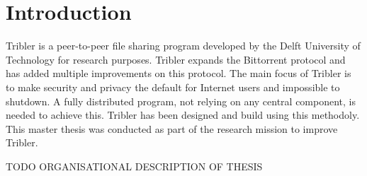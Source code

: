 \chapter{Introduction}
\label{chp:introduction}
Tribler is a peer-to-peer file sharing program developed by the Delft University of Technology for research purposes.
Tribler expands the Bittorrent protocol and has added multiple improvements on this protocol.
The main focus of Tribler is to make security and privacy the default for Internet users and impossible to shutdown.
A fully distributed program, not relying on any central component, is needed to achieve this.
Tribler has been designed and build using this methodoly\cite{Pouwelse-tribler}\cite{Bakker-tribler}.
This master thesis was conducted as part of the research mission to improve Tribler.

\vspace{1\baselineskip}

\noindent
TODO ORGANISATIONAL DESCRIPTION OF THESIS

